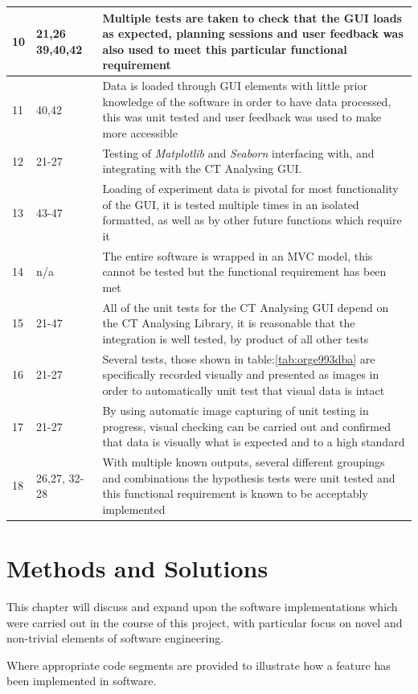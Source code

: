 \documentclass[11pt]{report}
\begin{document}
\begin{longtable}{|l|l|p{14cm}|}
\hline
10 & 21,26 39,40,42 & Multiple tests are taken to check that the GUI loads as expected, planning sessions and user feedback was also used to meet this particular functional requirement\\
\hline
11 & 40,42 & Data is loaded through GUI elements with little prior knowledge of the software in order to have data processed, this was unit tested and user feedback was used to make more accessible\\
\hline
12 & 21-27 & Testing of \emph{Matplotlib} and \emph{Seaborn} interfacing with, and integrating with the CT Analysing GUI.\\
\hline
13 & 43-47 & Loading of experiment data is pivotal for most functionality of the GUI, it is tested multiple times in an isolated formatted, as well as by other future functions which require it\\
\hline
14 & n/a & The entire software is wrapped in an MVC model, this cannot be tested but the functional requirement has been met\\
\hline
15 & 21-47 & All of the unit tests for the CT Analysing GUI depend on the CT Analysing Library, it is reasonable that the integration is well tested, by product of all other tests\\
\hline
16 & 21-27 & Several tests, those shown in table:\ref{tab:orge993dba} are specifically recorded visually and presented as images in order to automatically unit test that visual data is intact\\
\hline
17 & 21-27 & By using automatic image capturing of unit testing in progress, visual checking can be carried out and confirmed that data is visually what is expected and to a high standard\\
\hline
18 & 26,27, 32-28 & With multiple known outputs, several different groupings and combinations the hypothesis tests were unit tested and this functional requirement is known to be acceptably implemented\\
\hline
\end{longtable}

\chapter{Methods and Solutions}
\label{sec:org82e76a8}
This chapter will discuss and expand upon the software implementations which were carried out in the course of this project, with particular focus on novel and non-trivial elements of software engineering.

Where appropriate code segments are provided to illustrate how a feature has been implemented in software.
\end{document}
